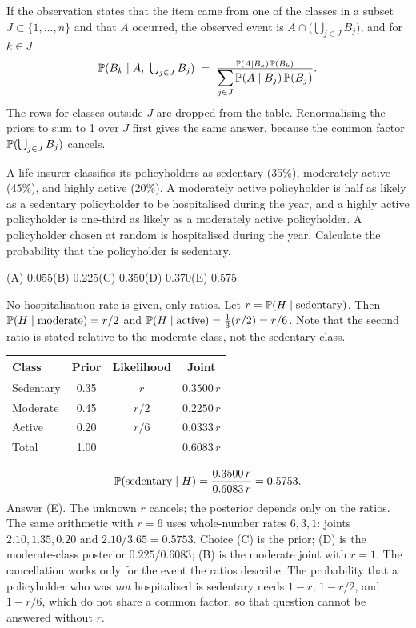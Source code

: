 \begin{keyfact}
If the observation states that the item came from one of the classes in a subset
$J \subset \{1, \dots, n\}$ and that $A$ occurred, the observed event is
$A \cap \bigl(\bigcup_{j \in J} B_j\bigr)$, and for $k \in J$
\[
\mathbb{P}(B_k \mid A,\ \textstyle\bigcup_{j \in J} B_j)
\;=\; \frac{\mathbb{P}(A \mid B_k)\,\mathbb{P}(B_k)}{\displaystyle\sum_{j \in J} \mathbb{P}(A \mid B_j)\,\mathbb{P}(B_j)}.
\]
The rows for classes outside $J$ are dropped from the table. Renormalising the priors to sum
to 1 over $J$ first gives the same answer, because the common factor $\mathbb{P}(\bigcup_{j \in J} B_j)$
cancels.
\end{keyfact}

\begin{example}
A life insurer classifies its policyholders as sedentary (35\%), moderately active (45\%),
and highly active (20\%). A moderately active policyholder is half as likely as a sedentary
policyholder to be hospitalised during the year, and a highly active policyholder is
one-third as likely as a moderately active policyholder. A policyholder chosen at random is
hospitalised during the year. Calculate the probability that the policyholder is sedentary.
\par\smallskip\noindent (A) 0.055\qquad (B) 0.225\qquad (C) 0.350\qquad (D) 0.370\qquad (E) 0.575
\end{example}
\begin{solution}
No hospitalisation rate is given, only ratios. Let $r = \mathbb{P}(H \mid \text{sedentary})$.
Then $\mathbb{P}(H \mid \text{moderate}) = r/2$ and
$\mathbb{P}(H \mid \text{active}) = \tfrac{1}{3}(r/2) = r/6$. Note that the second ratio is stated
relative to the moderate class, not the sedentary class.
\begin{center}
\begin{tabular}{@{}lccc@{}}
\toprule
Class & Prior & Likelihood & Joint \\
\midrule
Sedentary & 0.35 & $r$   & $0.3500\,r$ \\
Moderate  & 0.45 & $r/2$ & $0.2250\,r$ \\
Active    & 0.20 & $r/6$ & $0.0333\,r$ \\
\midrule
Total & 1.00 & & $0.6083\,r$ \\
\bottomrule
\end{tabular}
\end{center}
\[
\mathbb{P}(\text{sedentary} \mid H) = \frac{0.3500\,r}{0.6083\,r} = 0.5753.
\]
Answer (E). The unknown $r$ cancels; the posterior depends only on the ratios. The same
arithmetic with $r = 6$ uses whole-number rates $6, 3, 1$: joints $2.10, 1.35, 0.20$ and
$2.10/3.65 = 0.5753$. Choice (C) is the prior; (D) is the moderate-class posterior
$0.225/0.6083$; (B) is the moderate joint with $r = 1$. The cancellation works only for the
event the ratios describe. The probability that a policyholder who was \emph{not}
hospitalised is sedentary needs $1 - r$, $1 - r/2$, and $1 - r/6$, which do not share a
common factor, so that question cannot be answered without $r$.
\end{solution}

